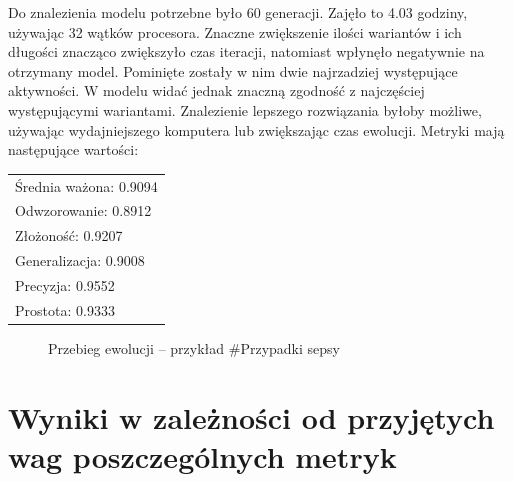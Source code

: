 Do znalezienia modelu potrzebne było 60 generacji. Zajęło to 4.03 godziny, używając 32 wątków procesora. Znaczne zwiększenie ilości wariantów i ich długości znacząco zwiększyło czas iteracji, natomiast wpłynęło negatywnie na otrzymany model. Pominięte zostały w nim dwie najrzadziej występujące aktywności. W modelu widać jednak znaczną zgodność z najczęściej występującymi wariantami. Znalezienie lepszego rozwiązania byłoby możliwe, używając wydajniejszego komputera lub zwiększając czas ewolucji. Metryki mają następujące wartości: 

 \begin{center}
  \begin{tabular}{l}
	Średnia ważona: 0.9094 \\
	Odwzorowanie: 0.8912 \\
	Złożoność: 0.9207 \\
	Generalizacja: 0.9008 \\
	Precyzja: 0.9552 \\
	Prostota: 0.9333
  \end{tabular}
 \end{center}
 
\begin{figure}[H]
	\caption{\label{fig:p88_chart}Przebieg ewolucji -- przykład \#Przypadki sepsy}
\end{figure}

\section{Wyniki w zależności od przyjętych wag poszczególnych metryk}


